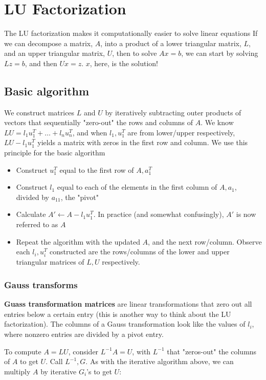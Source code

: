 \documentclass{article}
\begin{document}
\section{LU Factorization}
The LU factorization makes it computationally easier to solve linear equations If we can decompose a matrix, $A$, into a product of a lower triangular matrix, $L$, and an upper triangular matrix, $U$, then to solve $Ax=b$, we can start by solving $Lz=b$, and then $Ux=z$. $x$, here, is the solution!

\subsection{Basic algorithm}
We construct matrices $L$ and $U$ by iteratively subtracting outer products of vectors that sequentially "zero-out" the rows and columns of $A$. We know $LU = l_1u_1^T + \dots + l_nu_n^T$, and when $l_1, u_1^T$ are from lower/upper respectively, $LU - l_1u_1^T$ yields a matrix with zeros in the first row and column. We use this principle for the basic algorithm 
\begin{itemize}
    \item Construct $u_1^T$ equal to the first row of $A, a_1^T$
    \item Construct $l_1$ equal to each of the elements in the first column of $A, a_1$, divided by $a_{11}$, the "pivot"
    \item Calculate $A' \leftarrow A - l_1u_1^T$. In practice (and somewhat confusingly), $A'$ is now referred to as $A$
    \item Repeat the algorithm with the updated $A$, and the next row/column. Observe each $l_i, u_i^T$ constructed are the rows/columns of the lower and upper triangular matrices of $L, U$ respectively.
\end{itemize}

\subsubsection{Gauss transforms}
\textbf{Guass transformation matrices} are linear transformations that zero out all entries below a certain entry (this is another way to think about the LU factorization). The columns of a Gauss transformation look like the values of $l_i$, where nonzero entries are divided by a pivot entry.

To compute $A=LU$, consider $L^{-1}A = U$, with $L^{-1}$ that "zeros-out" the columns of $A$ to get $U$. Call $L^{-1}, G$. As with the iterative algorithm above, we can multiply $A$ by iterative $G_i$'s to get $U$:
\end{document}
